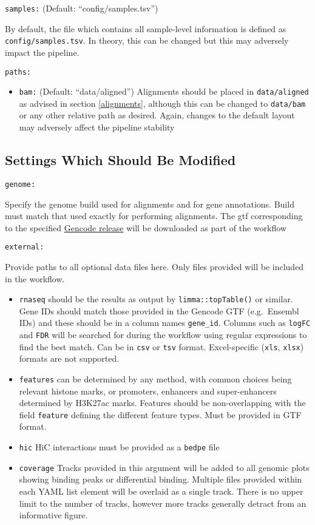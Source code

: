 \documentclass[
]{book}
\providecommand{\tightlist}{%
  \setlength{\itemsep}{0pt}\setlength{\parskip}{0pt}}
\begin{document}
\texttt{samples:} (Default: ``config/samples.tsv'')

By default, the file which contains all sample-level information is defined as \texttt{config/samples.tsv}.
In theory, this can be changed but this may adversely impact the pipeline.

\texttt{paths:}

\begin{itemize}
\tightlist
\item
  \texttt{bam:} (Default: ``data/aligned'') Alignments should be placed in \texttt{data/aligned} as advised in section \ref{alignments}, although this can be changed to \texttt{data/bam} or any other relative path as desired. Again, changes to the default layout may adversely affect the pipeline stability
\end{itemize}

\hypertarget{settings-which-should-be-modified}{%
\subsection*{Settings Which Should Be Modified}\label{settings-which-should-be-modified}}

\texttt{genome:}

Specify the genome build used for alignments and for gene annotations.
Build must match that used exactly for performing alignments.
The gtf corresponding to the specified \href{https://www.gencodegenes.org/}{Gencode release} will be downloaded as part of the workflow

\texttt{external:}

Provide paths to all optional data files here.
Only files provided will be included in the workflow.

\begin{itemize}
\tightlist
\item
  \texttt{rnaseq} should be the results as output by \texttt{limma::topTable()} or similar. Gene IDs should match those provided in the Gencode GTF (e.g.~Ensembl IDs) and these should be in a column names \texttt{gene\_id}. Columns such as \texttt{logFC} and \texttt{FDR} will be searched for during the workflow using regular expressions to find the best match. Can be in \texttt{csv} or \texttt{tsv} format. Excel-specific (\texttt{xls}, \texttt{xlsx}) formats are not supported.
\item
  \texttt{features} can be determined by any method, with common choices being relevant histone marks, or promoters, enhancers and super-enhancers determined by H3K27ac marks. Features should be non-overlapping with the field \texttt{feature} defining the different feature types. Must be provided in GTF format.
\item
  \texttt{hic} HiC interactions must be provided as a \texttt{bedpe} file
\item
  \texttt{coverage} Tracks provided in this argument will be added to all genomic plots showing binding peaks or differential binding. Multiple files provided within each YAML list element will be overlaid as a single track. There is no upper limit to the number of tracks, however more tracks generally detract from an informative figure.
\end{itemize}
\end{document}
